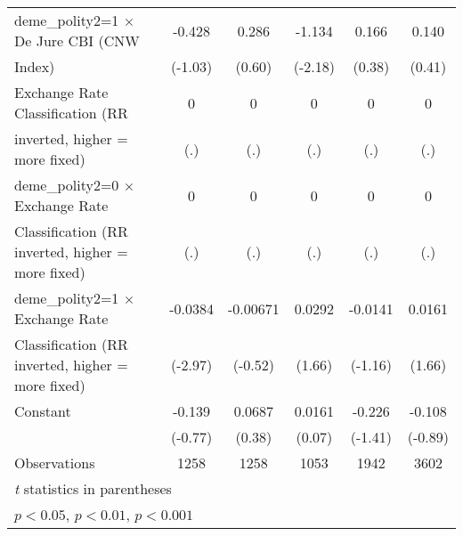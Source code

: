 \begin{table}[htbp]
\begin{tabular}{l*{5}{c}}
\addlinespace
deme\_polity2=1 $\times$ De Jure CBI (CNW&   -0.428         &    0.286         &   -1.134\sym{*}  &    0.166         &    0.140         \\
Index)                                  &  (-1.03)         &   (0.60)         &  (-2.18)         &   (0.38)         &   (0.41)         \\
\addlinespace
Exchange Rate Classification (RR        &        0         &        0         &        0         &        0         &        0         \\
inverted, higher = more fixed)          &      (.)         &      (.)         &      (.)         &      (.)         &      (.)         \\
\addlinespace
deme\_polity2=0 $\times$ Exchange Rate   &        0         &        0         &        0         &        0         &        0         \\
Classification (RR inverted, higher = more fixed)&      (.)         &      (.)         &      (.)         &      (.)         &      (.)         \\
\addlinespace
deme\_polity2=1 $\times$ Exchange Rate   &  -0.0384\sym{**} & -0.00671         &   0.0292         &  -0.0141         &   0.0161         \\
Classification (RR inverted, higher = more fixed)&  (-2.97)         &  (-0.52)         &   (1.66)         &  (-1.16)         &   (1.66)         \\
\addlinespace
Constant                                &   -0.139         &   0.0687         &   0.0161         &   -0.226         &   -0.108         \\
                                        &  (-0.77)         &   (0.38)         &   (0.07)         &  (-1.41)         &  (-0.89)         \\
\midrule
Observations                            &     1258         &     1258         &     1053         &     1942         &     3602         \\
\bottomrule
\multicolumn{6}{l}{\footnotesize \textit{t} statistics in parentheses}\\
\multicolumn{6}{l}{\footnotesize \sym{*} \(p<0.05\), \sym{**} \(p<0.01\), \sym{***} \(p<0.001\)}\\
\end{tabular}
\end{table}
